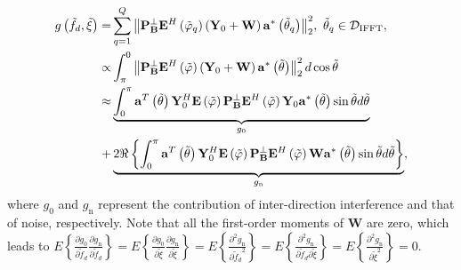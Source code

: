 \documentclass[12pt, draftclsnofoot, onecolumn]{IEEEtran}
\begin{document}
\begin{align}
g\left( {{{\tilde{f}}}_{d}}, \tilde{\xi } \right)= & \sum\limits_{q=1}^{Q} {\left\| \mathbf{P}_{\mathbf{B}}^{\bot }{{\mathbf{E}}^{H}}\left( {\tilde{\varphi }}_{q} \right)\left( {{\mathbf{Y}}_{0}}+\mathbf{W} \right){{\mathbf{a}}^{*}}\left( {\tilde{\theta }}_{q} \right) \right\|_{2}^{2}}, \ {\tilde{\theta}}_{q} \in {{{\mathcal{D}}}_{\text{IFFT}}}, \nonumber \\
\propto & \int_{\rm{\pi}}^{0} \left\| \mathbf{P}_{\mathbf{B}}^{\bot }{{\mathbf{E}}^{H}}\left( {\tilde{\varphi }} \right)\left( {{\mathbf{Y}}_{0}}+\mathbf{W} \right){{\mathbf{a}}^{*}}\left( {\tilde{\theta }} \right) \right\|_{2}^{2} d\cos \tilde{\theta } \nonumber \\
\approx & \underbrace{\int_{0}^{\rm{\pi}}{ {{\mathbf{a}}^{T}}\left( {\tilde{\theta }} \right)\mathbf{Y}_{0}^{H}\mathbf{E}\left( {\tilde{\varphi }} \right)\mathbf{P}_{\mathbf{B}}^{\bot }{{\mathbf{E}}^{H}}\left( {\tilde{\varphi }} \right){{\mathbf{Y}}_{0}}{{\mathbf{a}}^{*}}\left( {\tilde{\theta }} \right) \sin \tilde{\theta }d\tilde{\theta }}}_{{{g}_{0}}} \nonumber \\
+ & \underbrace{2\Re \left\{ \int_{0}^{\rm{\pi}}{ {{\mathbf{a}}^{T}}\left( {\tilde{\theta }} \right)\mathbf{Y}_{0}^{H}\mathbf{E}\left( {\tilde{\varphi }} \right)\mathbf{P}_{\mathbf{B}}^{\bot }{{\mathbf{E}}^{H}}\left( {\tilde{\varphi }} \right)\mathbf{W}{{\mathbf{a}}^{*}}\left( {\tilde{\theta }} \right) \sin \tilde{\theta }d\tilde{\theta }} \right\}}_{{{g}_{\mathrm{n}}}},
\end{align}
where ${{g}_{0}}$ and ${{g}_{\mathrm{n}}}$ represent the contribution of inter-direction interference and that of noise, respectively. Note that all the first-order moments of $\mathbf{W}$ are zero, which leads to $E\left\{ \frac{\partial {{g}_{0}}}{\partial {{{\tilde{f}}}_{d}}}\frac{\partial {{g}_{\mathrm{n}}}}{\partial {{{\tilde{f}}}_{d}}} \right\}=E\left\{ \frac{\partial {{g}_{0}}}{\partial \tilde{\xi }}\frac{\partial {{g}_{\mathrm{n}}}}{\partial \tilde{\xi }} \right\}=E\left\{ \frac{{{\partial }^{2}}{{g}_{\mathrm{n}}}}{\partial {{{\tilde{f}}}_{d}}^{2}} \right\}=E\left\{ \frac{{{\partial }^{2}}{{g}_{\mathrm{n}}}}{\partial {{{\tilde{f}}}_{d}}\partial \tilde{\xi }} \right\}=E\left\{ \frac{{{\partial }^{2}}{{g}_{\mathrm{n}}}}{\partial {{{\tilde{\xi }}}^{2}}} \right\}=0$.
\end{document}
